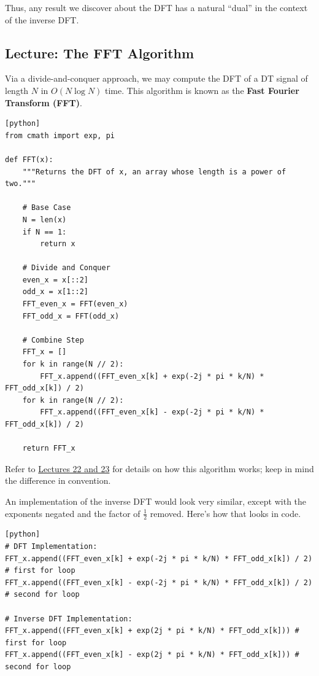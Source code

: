 Thus, any result we discover about the DFT
has a natural ``dual'' in the context of the inverse DFT.

\subsection{Lecture: The FFT Algorithm}

Via a divide-and-conquer approach, we may
compute the DFT of a DT signal of length $N$ in $O(N \log N)$ time.
This algorithm is known as the \textbf{Fast Fourier Transform (FFT)}.

\begin{verbatim}[python]
from cmath import exp, pi

def FFT(x):
    """Returns the DFT of x, an array whose length is a power of two."""

    # Base Case
    N = len(x)
    if N == 1:
        return x

    # Divide and Conquer
    even_x = x[::2]
    odd_x = x[1::2]
    FFT_even_x = FFT(even_x)
    FFT_odd_x = FFT(odd_x)

    # Combine Step
    FFT_x = []
    for k in range(N // 2):
        FFT_x.append((FFT_even_x[k] + exp(-2j * pi * k/N) * FFT_odd_x[k]) / 2)
    for k in range(N // 2):
        FFT_x.append((FFT_even_x[k] - exp(-2j * pi * k/N) * FFT_odd_x[k]) / 2)

    return FFT_x
\end{verbatim}

Refer to \href{/6.1220/lectures/22-23/}{Lectures 22 and 23}
for details on how this algorithm works;
keep in mind the difference in convention.

An implementation of the inverse DFT
would look very similar,
except with the exponents negated
and the factor of $\frac{1}{2}$ removed.
Here's how that looks in code.

\begin{verbatim}[python]
# DFT Implementation:
FFT_x.append((FFT_even_x[k] + exp(-2j * pi * k/N) * FFT_odd_x[k]) / 2) # first for loop
FFT_x.append((FFT_even_x[k] - exp(-2j * pi * k/N) * FFT_odd_x[k]) / 2) # second for loop

# Inverse DFT Implementation:
FFT_x.append((FFT_even_x[k] + exp(2j * pi * k/N) * FFT_odd_x[k])) # first for loop
FFT_x.append((FFT_even_x[k] - exp(2j * pi * k/N) * FFT_odd_x[k])) # second for loop
\end{verbatim}

